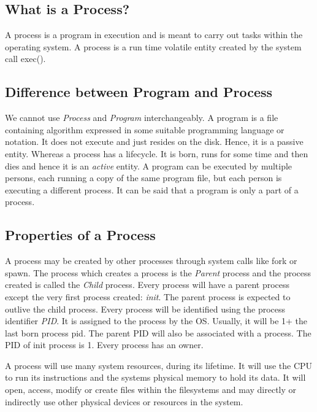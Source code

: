 \documentclass[12pt]{report}
\begin{document}
\subsection{What is a Process?}


A process is a program in execution and is meant to carry out tasks within the operating system. A process is a run time volatile entity created by the system call exec().

\subsection{Difference between Program and Process}

We cannot use \textit{Process} and \textit{Program} interchangeably. A  program is a file containing algorithm expressed in some suitable programming language or notation. It does not execute and just resides on the disk. Hence, it is a passive entity. Whereas a  process has a lifecycle. It is born, runs for some time and then dies and hence it is an \textit{active} entity. A program can be executed by multiple persons, each running a copy of the same program file, but each person is executing a different process. It can be said that a program is only a part of a process.  

\subsection{Properties of a Process}

A process may be created by other processes through system calls like fork or spawn. The process which creates a process is the \textit{Parent} process and the process created is called the \textit{Child} process. Every process will have a parent process except the very first process created: \textit{init}. The parent process is expected to outlive the child process. Every process will be identified using the process identifier \textit{PID}. It is assigned to the process by the OS. Usually, it will be 1+ the last born process pid. The parent PID will also be associated with a process. The PID of init process is 1. Every process has an owner.

A process will use many system resources, during its lifetime. It will use the CPU to run its instructions and the system\textquotesingle s physical memory to hold its data. It will open, access, modify or create files within the filesystems and may directly or indirectly use other physical devices or resources in the system. 
\end{document}
